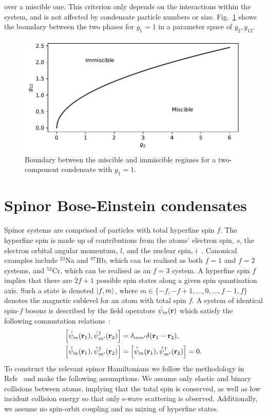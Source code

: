 over a miscible one.
This criterion only depends on the interactions within the system, and is not
affected by condensate particle numbers or size.
Fig.~\ref{fig: miscible-vs-immiscible} shows the boundary between the two
phases for \(g_1=1\) in a parameter space of \(g_2, g_{12}\).
\begin{figure}
    \centering
    \includegraphics{gfx/ch-theory/miscible_vs_immiscible.pdf}
    \caption[Two-component miscible vs immiscible boundary]
    {\label{fig: miscible-vs-immiscible}Boundary between the miscible
        and immiscible regimes for a two-component condensate with \(g_1=1\).}
\end{figure}


\section{Spinor Bose-Einstein condensates}
Spinor systems are comprised of particles with total hyperfine spin \(f\).
The hyperfine spin is made up of contributions from the atoms' electron spin,
\(s\), the electron orbital angular momentum, \(l\), and the nuclear spin,
\(i\)~\cite{Kawaguchi2012}.
Canonical examples include \(^{23}\)Na and \(^{87}\)Rb, which can be realised as
both \(f=1\) and \(f=2\) systems, and \(^{52}\)Cr, which can be realised as an
\(f=3\) system.
A hyperfine spin \(f\) implies that there are \(2f + 1\) possible spin states
along a given spin quantisation axis.
Such a state is denoted \(\ket{f, m} \), where
\(m \in \{-f, -f+1, \ldots, 0, \ldots, f - 1, f\} \) denotes the magnetic
sublevel for an atom with total spin \( f\).
A system of identical spin-\(f\) bosons is described by the field operators
\(\hat{\psi}_m(\vb{r})\) which satisfy the following commutation
relations~\cite{Kawaguchi2012}:
\begin{align}
    \left[\hat{\psi}_m(\vb{r}_1), \hat{\psi}^\dagger_{m'}(\vb{r}_2)\right]
    &= \delta_{mm'}\delta(\vb{r}_1 - \vb{r}_2), \\
    \left[\hat{\psi}_m(\vb{r}_1), \hat{\psi}^\dagger_{m'}(\vb{r}_2)\right] &=
    \left[\hat{\psi}_m(\vb{r}_1), \hat{\psi}^\dagger_{m'}(\vb{r}_2)\right] = 0.
\end{align}
To construct the relevant spinor Hamiltonians we follow the methodology in
Refs~\cite{Ho1998,Ohmi1998,Kawaguchi2012,Stamper-Kurn2013,Symes2019} and make
the following assumptions: We assume only elastic and binary collisions between
atoms, implying that the total spin is conserved, as well as low incident
collision energy so that only s-wave scattering is observed.
Additionally, we assume no spin-orbit coupling and no mixing of
hyperfine states.

